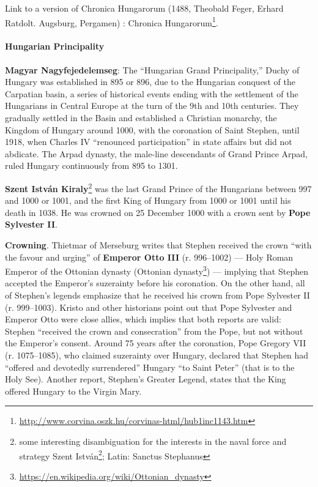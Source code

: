 Link to a version of Chronica Hungarorum (1488, Theobald Feger, Erhard Ratdolt. Augsburg, Pergamen) : Chronica Hungarorum\footnote{\url{http://www.corvina.oszk.hu/corvinas-html/hub1inc1143.htm}}.

\paragraph{Hungarian Principality}

\textbf{Magyar Nagyfejedelemseg}: The ``Hungarian Grand Principality,'' Duchy of Hungary was established in 895 or 896, due to the Hungarian conquest of the Carpatian basin, a series of historical events ending with the settlement of the Hungarians in Central Europe at the turn of the 9th and 10th centuries. They gradually settled in the Basin and established a Christian monarchy, the Kingdom of Hungary around 1000, with the coronation of Saint Stephen, until 1918, when Charles IV ``renounced participation'' in state affairs but did not abdicate. The Arpad dynasty, the male-line descendants of Grand Prince Arpad, ruled Hungary continuously from 895 to 1301.

\textbf{Szent István Kiraly}\footnote{some interesting disambiguation for the interests in the naval force and strategy Szent István\footnote{\url{https://en.wikipedia.org/wiki/SMS\_Szent\_István}}; Latin: Sanctus Stephanus} was the last Grand Prince of the Hungarians between 997 and 1000 or 1001, and the first King of Hungary from 1000 or 1001 until his death in 1038. He was crowned on 25 December 1000 with a crown sent by \textbf{Pope Sylvester II}.

\textbf{Crowning}. Thietmar of Merseburg writes that Stephen received the crown ``with the favour and urging'' of \textbf{Emperor Otto III} (r. 996--1002) --- Holy Roman Emperor of the Ottonian dynasty (Ottonian dynasty\footnote{\url{https://en.wikipedia.org/wiki/Ottonian\_dynasty}}) --- implying that Stephen accepted the Emperor's suzerainty before his coronation. On the other hand, all of Stephen's legends emphasize that he received his crown from Pope Sylvester II (r. 999--1003). Kristo and other historians point out that Pope Sylvester and Emperor Otto were close allies, which implies that both reports are valid: Stephen ``received the crown and consecration'' from the Pope, but not without the Emperor's consent. Around 75 years after the coronation, Pope Gregory VII (r. 1075--1085), who claimed suzerainty over Hungary, declared that Stephen had ``offered and devotedly surrendered'' Hungary ``to Saint Peter'' (that is to the Holy See). Another report, Stephen's Greater Legend, states that the King offered Hungary to the Virgin Mary.

